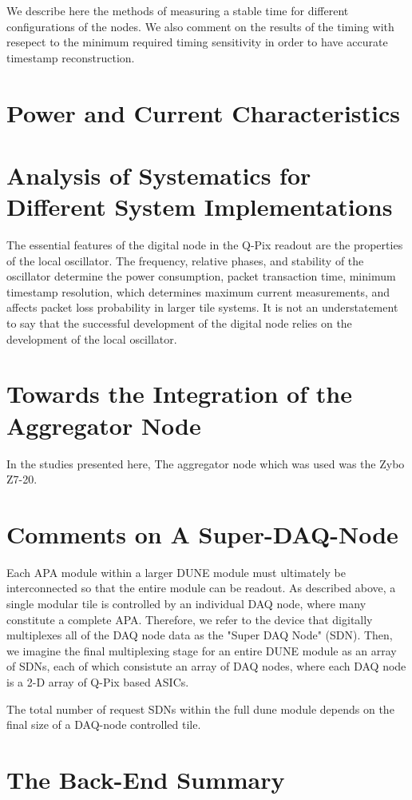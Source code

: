 We describe here the methods of measuring a stable time for different configurations of the nodes.
We also comment on the results of the timing with resepect to the minimum required timing sensitivity in order to have accurate timestamp reconstruction.

\section{Power and Current Characteristics}


\section{Analysis of Systematics for Different System Implementations}

The essential features of the digital node in the Q-Pix readout are the properties of the local oscillator.
The frequency, relative phases, and stability of the oscillator determine the power consumption, packet transaction time, minimum timestamp resolution, which determines maximum current measurements, and affects packet loss probability in larger tile systems.
It is not an understatement to say that the successful development of the digital node relies on the development of the local oscillator.

\section{Towards the Integration of the Aggregator Node}

In the studies presented here, The aggregator node which was used was the Zybo Z7-20.


\section{Comments on A Super-DAQ-Node}

Each APA module within a larger DUNE module must ultimately be interconnected so that the entire module can be readout.
As described above, a single modular tile is controlled by an individual DAQ node, where many constitute a complete APA.
Therefore, we refer to the device that digitally multiplexes all of the DAQ node data as the "Super DAQ Node" (SDN).
Then, we imagine the final multiplexing stage for an entire DUNE module as an array of SDNs, each of which consistute an array of DAQ nodes, where each DAQ node is a 2-D array of Q-Pix based ASICs.

The total number of request SDNs within the full dune module depends on the final size of a DAQ-node controlled tile.


\section{The Back-End Summary}
